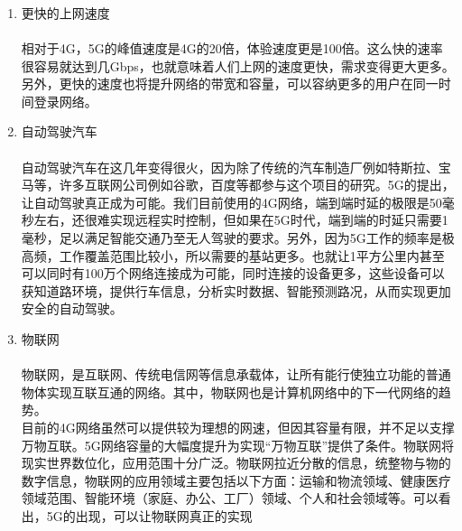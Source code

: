 \documentclass[a4paper,10pt]{ctexart}
\begin{document}
\subsubsection*{}
\begin{enumerate}
\item 更快的上网速度

\paragraph{} 
 相对于4G，5G的峰值速度是4G的20倍，体验速度更是100倍。这么快的速率很容易就达到几Gbps，也就意味着人们上网的速度更快，需求变得更大更多。\\
 另外，更快的速度也将提升网络的带宽和容量，可以容纳更多的用户在同一时间登录网络。
 
\item 自动驾驶汽车
\paragraph{}
自动驾驶汽车在这几年变得很火，因为除了传统的汽车制造厂例如特斯拉、宝马等，许多互联网公司例如谷歌，百度等都参与这个项目的研究。5G的提出，让自动驾驶真正成为可能。我们目前使用的4G网络，端到端时延的极限是50毫秒左右，还很难实现远程实时控制，但如果在5G时代，端到端的时延只需要1毫秒，足以满足智能交通乃至无人驾驶的要求。另外，因为5G工作的频率是极高频，工作覆盖范围比较小，所以需要的基站更多。也就让1平方公里内甚至可以同时有100万个网络连接成为可能，同时连接的设备更多，这些设备可以获知道路环境，提供行车信息，分析实时数据、智能预测路况，从而实现更加安全的自动驾驶。

\item 物联网
\paragraph{}

物联网，是互联网、传统电信网等信息承载体，让所有能行使独立功能的普通物体实现互联互通的网络。其中，物联网也是计算机网络中的下一代网络的趋势。\\
目前的4G网络虽然可以提供较为理想的网速，但因其容量有限，并不足以支撑万物互联。5G网络容量的大幅度提升为实现“万物互联”提供了条件。物联网将现实世界数位化，应用范围十分广泛。物联网拉近分散的信息，统整物与物的数字信息，物联网的应用领域主要包括以下方面：运输和物流领域、健康医疗领域范围、智能环境（家庭、办公、工厂）领域、个人和社会领域等。可以看出，5G的出现，可以让物联网真正的实现
\end{enumerate}
\end{document}
